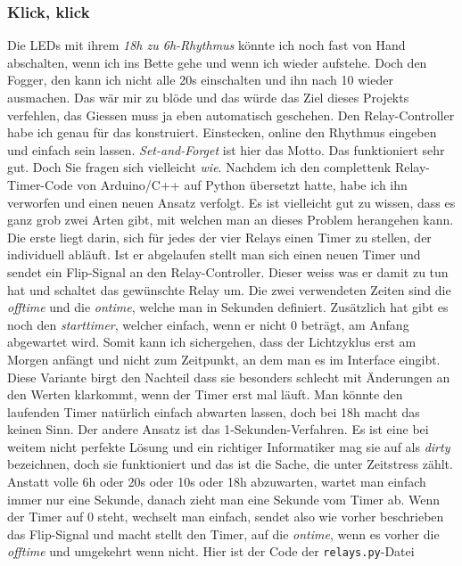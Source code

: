 \documentclass[12pt,titlepage,a4paper]{article}
\begin{document}
\subsubsection{Klick, klick}
Die LEDs mit ihrem \textit{18h zu 6h-Rhythmus} könnte ich noch fast von Hand abschalten, wenn ich ins Bette gehe und wenn ich wieder aufstehe. Doch den Fogger, den kann ich nicht alle 20s einschalten und ihn nach 10 wieder ausmachen. Das wär mir zu blöde und das würde das Ziel dieses Projekts verfehlen, das Giessen muss ja eben automatisch geschehen. Den Relay-Controller habe ich genau für das konstruiert. Einstecken, online den Rhythmus eingeben und einfach sein lassen. \textit{Set-and-Forget} ist hier das Motto. Das funktioniert sehr gut. Doch Sie fragen sich vielleicht \textit{wie}. Nachdem ich den complettenk Relay-Timer-Code von Arduino/C++ auf Python übersetzt hatte, habe ich ihn verworfen und einen neuen Ansatz verfolgt. Es ist vielleicht gut zu wissen, dass es ganz grob zwei Arten gibt, mit welchen man an dieses Problem herangehen kann. Die erste liegt darin, sich für jedes der vier Relays einen Timer zu stellen, der individuell abläuft. Ist er abgelaufen stellt man sich einen neuen Timer und sendet ein Flip-Signal an den Relay-Controller. Dieser weiss was er damit zu tun hat und schaltet das gewünschte Relay um. Die zwei verwendeten Zeiten sind die \textit{offtime} und die \textit{ontime}, welche man in Sekunden definiert. Zusätzlich hat gibt es noch den \textit{starttimer}, welcher einfach, wenn er nicht 0 beträgt, am Anfang abgewartet wird. Somit kann ich sichergehen, dass der Lichtzyklus erst am Morgen anfängt und nicht zum Zeitpunkt, an dem man es im Interface eingibt. Diese Variante birgt den Nachteil dass sie besonders schlecht mit Änderungen an den Werten klarkommt, wenn der Timer erst mal läuft. Man könnte den laufenden Timer natürlich einfach abwarten lassen, doch bei 18h macht das keinen Sinn. Der andere Ansatz ist das 1-Sekunden-Verfahren. Es ist eine bei weitem nicht perfekte Lösung und ein richtiger Informatiker mag sie auf als \textit{dirty} bezeichnen, doch sie funktioniert und das ist die Sache, die unter Zeitstress zählt. Anstatt volle 6h oder 20s oder 10s oder 18h abzuwarten, wartet man einfach immer nur eine Sekunde, danach zieht man eine Sekunde vom Timer ab. Wenn der Timer auf 0 steht, wechselt man einfach, sendet also wie vorher beschrieben das Flip-Signal und macht stellt den Timer, auf die \textit{ontime}, wenn es vorher die \textit{offtime} und umgekehrt wenn nicht. Hier ist der Code der \verb&relays.py&-Datei
\end{document}
